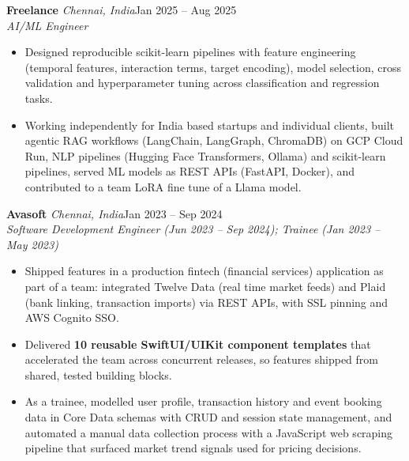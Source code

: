 \documentclass[a4paper,11pt]{article}
\newcommand{\role}[4]{%
  \textbf{#1}{\color{muted}\,\textperiodcentered\,\textit{#2}}\hfill{\color{muted}#3}\\
  \textit{#4}\par}
\newcommand{\gap}{\vspace{5pt}}
\newcommand{\num}[1]{\textbf{#1}}   %
\begin{document}
\gap
{}
\role{Freelance}{Chennai, India}{Jan 2025 – Aug 2025}{AI/ML Engineer}
\begin{itemize}
  \item Designed reproducible scikit-learn pipelines with feature engineering (temporal features, interaction terms, target encoding), model selection, cross validation and hyperparameter tuning across classification and regression tasks.
  \item Working independently for India based startups and individual clients, built agentic RAG workflows (LangChain, LangGraph, ChromaDB) on GCP Cloud Run, NLP pipelines (Hugging Face Transformers, Ollama) and scikit-learn pipelines, served ML models as REST APIs (FastAPI, Docker), and contributed to a team LoRA fine tune of a Llama model.
\end{itemize}
\gap
{}
\role{Avasoft}{Chennai, India}{Jan 2023 – Sep 2024}{Software Development Engineer (Jun 2023 – Sep 2024); Trainee (Jan 2023 – May 2023)}
\begin{itemize}
  \item Shipped features in a production fintech (financial services) application as part of a team: integrated Twelve Data (real time market feeds) and Plaid (bank linking, transaction imports) via REST APIs, with SSL pinning and AWS Cognito SSO.
  \item Delivered \num{10 reusable SwiftUI/UIKit component templates} that accelerated the team across concurrent releases, so features shipped from shared, tested building blocks.
  \item As a trainee, modelled user profile, transaction history and event booking data in Core Data schemas with CRUD and session state management, and automated a manual data collection process with a JavaScript web scraping pipeline that surfaced market trend signals used for pricing decisions.
\end{itemize}
\end{document}
